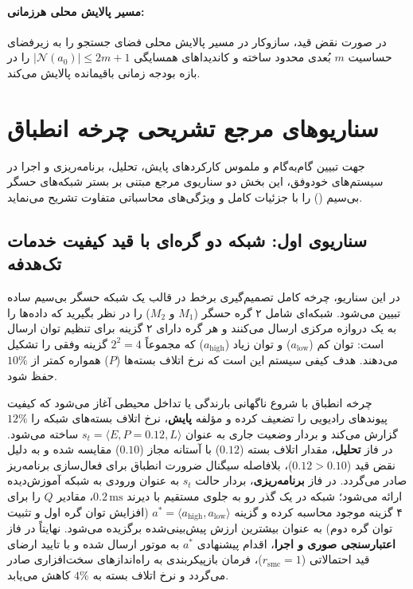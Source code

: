 \documentclass[oneside,openany,phd]{TMU-Thesis}
\begin{document}
\paragraph{مسیر پالایش محلی هرزمانی:} در صورت نقض قید، سازوکار \pgalr در مسیر پالایش محلی فضای جستجو را به زیرفضای حساسیت $m$ بُعدی محدود ساخته و کاندیداهای همسایگی $|\mathcal{N}(a_0)| \le 2m + 1$ را در بازه بودجه زمانی باقیمانده پالایش می‌کند.

\section{سناریوهای مرجع تشریحی چرخه انطباق}
\label{sec:appendix_running_example}

جهت تبیین گام‌به‌گام و ملموس کارکردهای پایش، تحلیل، برنامه‌ریزی و اجرا در سیستم‌های خودوفق، این بخش دو سناریوی مرجع مبتنی بر بستر شبکه‌های حسگر بی‌سیم () را با جزئیات کامل و ویژگی‌های محاسباتی متفاوت تشریح می‌نماید.

\subsection{سناریوی اول: شبکه دو گره‌ای با قید کیفیت خدمات تک‌هدفه}
\label{subsec:app_scenario_2node}
در این سناریو، چرخه کامل تصمیم‌گیری برخط در قالب یک شبکه حسگر بی‌سیم ساده تبیین می‌شود. شبکه‌ای شامل ۲ گره حسگر ($M_1$ و $M_2$) را در نظر بگیرید که داده‌ها را به یک دروازه مرکزی ارسال می‌کنند و هر گره دارای ۲ گزینه برای تنظیم توان ارسال است: توان کم ($a_{\text{low}}$) و توان زیاد ($a_{\text{high}}$) که مجموعاً $2^2 = 4$ گزینه وفقی را تشکیل می‌دهند. هدف کیفی سیستم این است که نرخ اتلاف بسته‌ها ($P$) همواره کمتر از $10\%$ حفظ شود.

چرخه انطباق با شروع ناگهانی بارندگی یا تداخل محیطی آغاز می‌شود که کیفیت پیوندهای رادیویی را تضعیف کرده و مؤلفه \textbf{پایش}، نرخ اتلاف بسته‌های شبکه را $12\%$ گزارش می‌کند و بردار وضعیت جاری به عنوان $s_t = \langle E, P=0.12, L \rangle$ ساخته می‌شود. در فاز \textbf{تحلیل}، مقدار اتلاف بسته ($0.12$) با آستانه مجاز ($0.10$) مقایسه شده و به دلیل نقض قید ($0.12 > 0.10$)، بلافاصله سیگنال ضرورت انطباق برای فعال‌سازی برنامه‌ریز صادر می‌گردد. در فاز \textbf{برنامه‌ریزی}، بردار حالت $s_t$ به عنوان ورودی به شبکه  آموزش‌دیده ارائه می‌شود؛ شبکه در یک گذر رو به جلوی مستقیم با دیرند $0.2\,\text{ms}$، مقادیر $Q$ را برای ۴ گزینه موجود محاسبه کرده و گزینه $a^* = \langle a_{\text{high}}, a_{\text{low}} \rangle$ (افزایش توان گره اول و تثبیت توان گره دوم) به عنوان بیشترین ارزش پیش‌بینی‌شده برگزیده می‌شود. نهایتاً در فاز \textbf{اعتبارسنجی صوری و اجرا}، اقدام پیشنهادی $a^*$ به موتور  ارسال شده و با تایید ارضای قید احتمالاتی ($r_{\text{smc}} = 1$)، فرمان بازپیکربندی به راه‌اندازهای سخت‌افزاری صادر می‌گردد و نرخ اتلاف بسته به $4\%$ کاهش می‌یابد.
\end{document}
